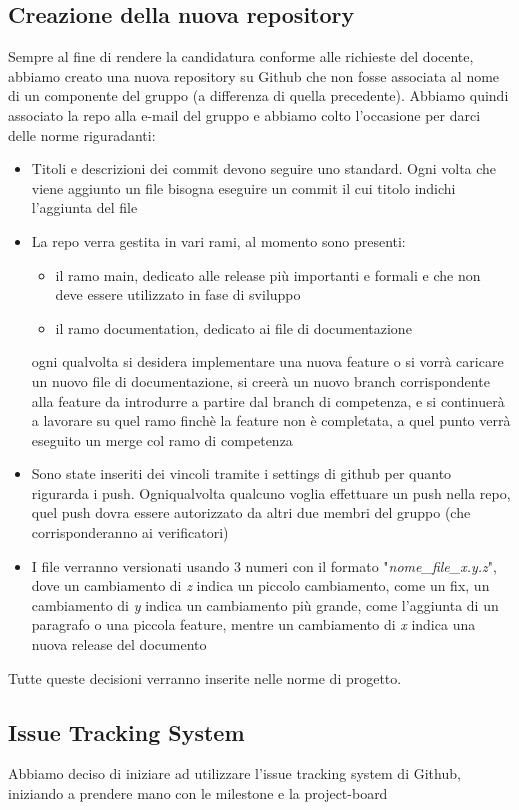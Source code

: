 \subsection{Creazione della nuova repository}
Sempre al fine di rendere la candidatura conforme alle richieste del docente, abbiamo creato una nuova repository su Github che non fosse associata al nome di un componente del gruppo (a differenza di quella precedente). Abbiamo quindi associato la repo alla e-mail del gruppo e abbiamo colto l'occasione per darci delle norme riguradanti:
\begin{itemize}
	\item Titoli e descrizioni dei commit devono seguire uno standard. Ogni volta che viene aggiunto un file bisogna eseguire un commit il cui titolo indichi l'aggiunta del file
	\item La repo verra gestita in vari rami, al momento sono presenti:
	\begin{itemize}
 		\item il ramo main, dedicato alle release più importanti e formali e che non deve essere utilizzato in fase di sviluppo
		\item il ramo documentation, dedicato ai file di documentazione
	\end{itemize}
	ogni qualvolta si desidera implementare una nuova feature o si vorrà caricare un nuovo file di documentazione, si creerà un nuovo branch corrispondente alla feature da introdurre a partire dal branch di competenza, e si continuerà a lavorare su quel ramo finchè la feature non è completata, a quel punto verrà eseguito un merge col ramo di competenza
	\item Sono state inseriti dei vincoli tramite i settings di github per quanto rigurarda i push. Ogniqualvolta qualcuno voglia effettuare un push nella repo, quel push dovra essere autorizzato da altri due membri del gruppo (che corrisponderanno ai verificatori)
	\item I file verranno versionati usando 3 numeri con il formato "\textit{nome\_file\_x.y.z}", dove un cambiamento di \textit{z} indica un piccolo cambiamento, come un fix, un cambiamento di \textit{y} indica un cambiamento più grande, come l'aggiunta di un paragrafo o una piccola feature, mentre  un cambiamento di \textit{x} indica una nuova release del documento
\end{itemize}
Tutte queste decisioni verranno inserite nelle norme di progetto.

\subsection{Issue Tracking System}
Abbiamo deciso di iniziare ad utilizzare l'issue tracking system di Github, iniziando a prendere mano con le milestone e la project-board

